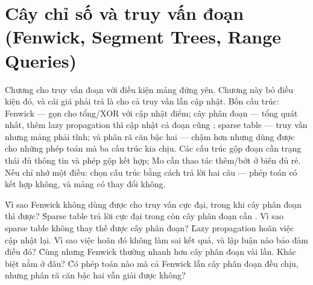 \documentclass[../../algorithm.tex]{subfiles}
\begin{document}
\chapter{Cây chỉ số và truy vấn đoạn (Fenwick, Segment Trees, Range Queries)}

\begin{tomtat}
Chương  cho truy vấn đoạn  với điều kiện mảng đứng yên. Chương này bỏ điều kiện đó, và cái giá phải trả là  cho cả truy vấn lẫn cập nhật. Bốn cấu trúc: Fenwick --- gọn cho tổng/XOR với cập nhật điểm; cây phân đoạn --- tổng quát nhất, thêm lazy propagation thì cập nhật cả đoạn cũng ; sparse table ---  truy vấn nhưng mảng phải tĩnh; và phân rã căn bậc hai --- chậm hơn nhưng dùng được cho những phép toán mà ba cấu trúc kia chịu. Các cấu trúc gộp đoạn cần trạng thái đủ thông tin và phép gộp kết hợp; Mo cần thao tác thêm/bớt ở biên đủ rẻ. Nếu chỉ nhớ một điều: chọn cấu trúc bằng cách trả lời hai câu --- phép toán có kết hợp không, và mảng có thay đổi không.
\end{tomtat}

\begin{nentang}
\end{nentang}

\begin{khoigoi}
\h{Vì sao Fenwick không dùng được cho truy vấn cực đại, trong khi cây phân đoạn thì được?}
\h{Sparse table trả lời cực đại trong  còn cây phân đoạn cần . Vì sao sparse table không thay thế được cây phân đoạn?}
\h{Lazy propagation hoãn việc cập nhật lại. Vì sao việc hoãn đó không làm sai kết quả, và lập luận nào bảo đảm điều đó?}
\h{Cùng  nhưng Fenwick thường nhanh hơn cây phân đoạn vài lần. Khác biệt nằm ở đâu?}
\h{Có phép toán nào mà cả Fenwick lẫn cây phân đoạn đều chịu, nhưng phân rã căn bậc hai vẫn giải được không?}
\end{khoigoi}
\end{document}
